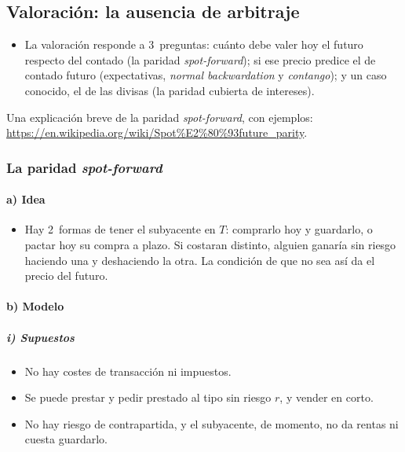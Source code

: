 \documentclass[11pt]{article}
\begin{document}
\subsection{Valoración: la ausencia de arbitraje}\label{sec:valoracion-futuros}

\begin{itemize}
\item La valoración responde a 3~preguntas: cuánto debe valer hoy el futuro respecto del contado (la paridad \emph{spot-forward}); si ese precio predice el de contado futuro (expectativas, \emph{normal backwardation} y \emph{contango}); y un caso conocido, el de las divisas (la paridad cubierta de intereses).
\end{itemize}

\begin{anotaciones}
Una explicación breve de la paridad \emph{spot-forward}, con ejemplos: \url{https://en.wikipedia.org/wiki/Spot\%E2\%80\%93future_parity}.
\end{anotaciones}

\subsubsection{La paridad \emph{spot-forward}}\label{sec:spot-forward}

\paragraph{a) Idea}

\begin{itemize}
\item Hay 2~formas de tener el subyacente en $T$: comprarlo hoy y guardarlo, o pactar hoy su compra a plazo. Si costaran distinto, alguien ganaría sin riesgo haciendo una y deshaciendo la otra. La condición de que no sea así da el precio del futuro.
\end{itemize}

\paragraph{b) Modelo}

\subparagraph{i) Supuestos}

\begin{itemize}
\item No hay costes de transacción ni impuestos.
\item Se puede prestar y pedir prestado al tipo sin riesgo $r$, y vender en corto.
\item No hay riesgo de contrapartida, y el subyacente, de momento, no da rentas ni cuesta guardarlo.
\end{itemize}
\end{document}
